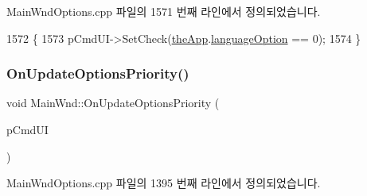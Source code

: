 Main\+Wnd\+Options.\+cpp 파일의 1571 번째 라인에서 정의되었습니다.


\begin{DoxyCode}
1572 \{
1573   pCmdUI->SetCheck(\mbox{\hyperlink{_v_b_a_8cpp_a8095a9d06b37a7efe3723f3218ad8fb3}{theApp}}.\mbox{\hyperlink{class_v_b_a_ac747a07ec2db4bcddea1b4581ebe5c6b}{languageOption}} == 0);
1574 \}
\end{DoxyCode}
\mbox{\label{class_main_wnd_ad41b7cfd6de150a00d8fd50b498b0a96}} 
\subsubsection{\texorpdfstring{On\+Update\+Options\+Priority()}{OnUpdateOptionsPriority()}}
{\footnotesize\ttfamily void Main\+Wnd\+::\+On\+Update\+Options\+Priority (\begin{DoxyParamCaption}\item[{C\+Cmd\+UI $\ast$}]{p\+Cmd\+UI }\end{DoxyParamCaption})}



Main\+Wnd\+Options.\+cpp 파일의 1395 번째 라인에서 정의되었습니다.


